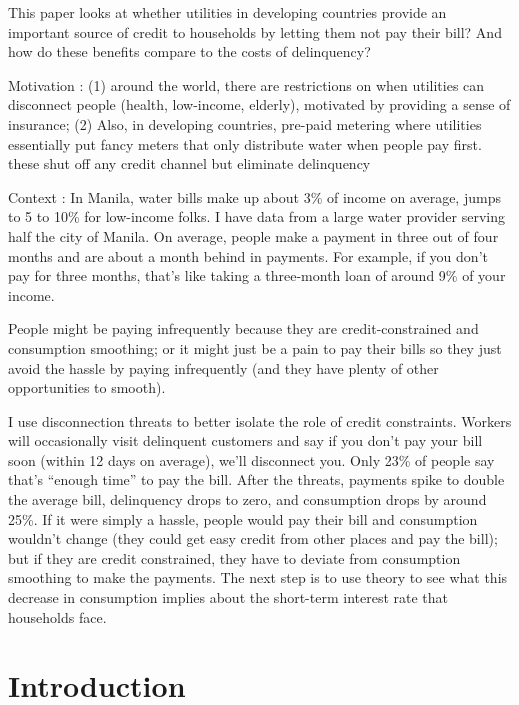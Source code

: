 \documentclass[12pt]{article}
\begin{document}
This paper looks at whether utilities in developing countries provide an important source of credit to households by letting them not pay their bill?  And how do these benefits compare to the costs of delinquency?

Motivation : (1) around the world, there are restrictions on when utilities can disconnect people (health, low-income, elderly), motivated by providing a sense of insurance;  (2) Also, in developing countries, pre-paid metering where utilities essentially put fancy meters that only distribute water when people pay first.  these shut off any credit channel but eliminate delinquency

Context : In Manila, water bills make up about 3\% of income on average, jumps to 5 to 10\% for low-income folks.  I have data from a large water provider serving half the city of Manila.  On average, people make a payment in three out of four months and are about a month behind in payments.  For example, if you don't pay for three months, that's like taking a three-month loan of around 9\% of your income.  

People might be paying infrequently because they are credit-constrained and consumption smoothing; or it might just be a pain to pay their bills so they just avoid the hassle by paying infrequently (and they have plenty of other opportunities to smooth).  

I use disconnection threats to better isolate the role of credit constraints.  Workers will occasionally visit delinquent customers and say if you don't pay your bill soon (within 12 days on average), we'll disconnect you.  Only 23\% of people say that's ``enough time'' to pay the bill.  After the threats, payments spike to double the average bill, delinquency drops to zero, and consumption drops by around 25\%.  If it were simply a hassle, people would pay their bill and consumption wouldn't change (they could get easy credit from other places and pay the bill); but if they are credit constrained, they have to deviate from consumption smoothing to make the payments.  The next step is to use theory to see what this decrease in consumption implies about the short-term interest rate that households face.


\section{Introduction}


\end{document}
